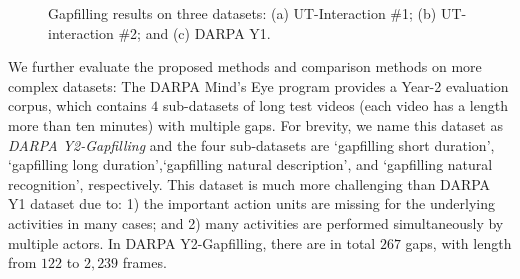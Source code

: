 \begin{figure}[htbp]
  \centering
  \caption{Gapfilling results on three datasets: (a) UT-Interaction \#1; (b)
    UT-interaction \#2; and (c) DARPA Y1.}
  \vspace{-2mm}
  \label{fig:gapfilling_comparison_single_verb}
\end{figure}

We further evaluate the proposed methods and comparison methods on more complex
datasets: The DARPA Mind's Eye program provides a Year-2 evaluation corpus,
which contains $4$ sub-datasets of long test videos (each video has a length
more than ten minutes) with multiple gaps. For brevity, we name this dataset as
\textit{DARPA Y2-Gapfilling} and the four sub-datasets are `gapfilling short
duration', `gapfilling long duration',`gapfilling natural description', and
`gapfilling natural recognition', respectively. This dataset is much more
challenging than DARPA Y1 dataset due to: 1) the important action units are
missing for the underlying activities in many cases; and 2) many activities are
performed simultaneously by multiple actors. In DARPA Y2-Gapfilling, there are
in total $267$ gaps, with length from $122$ to $2,239$ frames.

